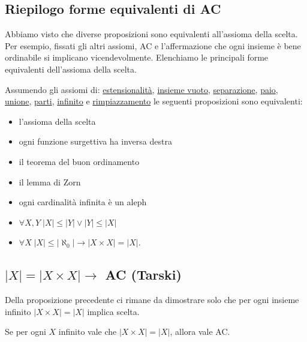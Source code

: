 \subsection{\texorpdfstring{\;Riepilogo forme equivalenti di AC}{Riepilogo forme equivalenti di AC}}
Abbiamo visto che diverse proposizioni sono equivalenti all'assioma della scelta. Per esempio, fissati gli altri assiomi, AC e 
l'affermazione che ogni insieme è bene ordinabile si implicano vicendevolmente. Elenchiamo le principali forme equivalenti dell'assioma della scelta.

\begin{proposition}
	Assumendo gli assiomi di: \hyperref[ax2]{estensionalità}, \hyperref[ax1]{insieme vuoto}, \hyperref[ax3]{separazione}, \hyperref[ax4]{paio}, \hyperref[ax5]{unione},
	\hyperref[ax6]{parti}, \hyperref[ax7]{infinito} e \hyperref[ax8]{rimpiazzamento} le seguenti proposizioni sono equivalenti:
	\begin{itemize}
		\item l'assioma della scelta
		\item ogni funzione surgettiva ha inversa destra
		\item il teorema del buon ordinamento
		\item il lemma di Zorn
		\item ogni cardinalità infinita è un aleph
		\item $\forall X,Y \; |X| \leq |Y| \lor |Y| \leq |X|$
		\item $\forall X \; |X| \leq |\aleph_0| \rightarrow |X \times X| = |X|$.
	\end{itemize}
\end{proposition}

\subsection{\texorpdfstring{\;$|X| = |X \times X| \rightarrow$ AC (Tarski)}{Teorema di Tarski sulla scelta}}
Della proposizione precedente ci rimane da dimostrare solo che per ogni insieme infinito $|X \times X| = |X|$ implica scelta.

\begin{theorem}
	Se per ogni $X$ infinito vale che $|X \times X| = |X|$, allora vale AC.
\end{theorem}

